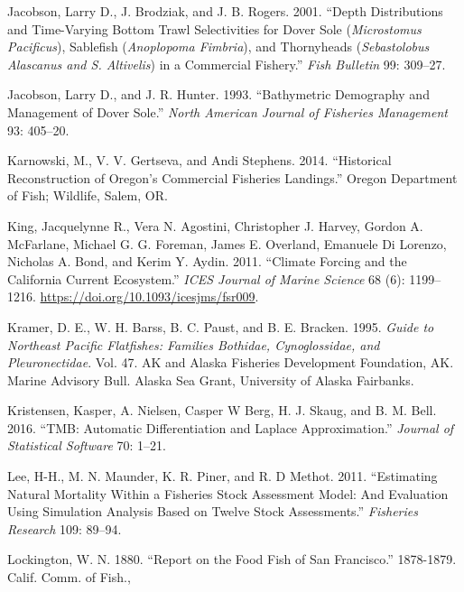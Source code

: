\documentclass[11pt,
  english,
  a4paper,
]{article}
\begin{document}
\begin{cslreferences}
\leavevmode\hypertarget{ref-jacobson_depth_2001}{}%
Jacobson, Larry D., J. Brodziak, and J. B. Rogers. 2001. ``Depth Distributions and Time-Varying Bottom Trawl Selectivities for Dover Sole (\emph{Microstomus Pacificus}), Sablefish (\emph{Anoplopoma Fimbria}), and Thornyheads (\emph{Sebastolobus Alascanus and S. Altivelis}) in a Commercial Fishery.'' \emph{Fish Bulletin} 99: 309--27.

\leavevmode\hypertarget{ref-jacobson_bathymetric_1993}{}%
Jacobson, Larry D., and J. R. Hunter. 1993. ``Bathymetric Demography and Management of Dover Sole.'' \emph{North American Journal of Fisheries Management} 93: 405--20.

\leavevmode\hypertarget{ref-karnowski_historical_2014}{}%
Karnowski, M., V. V. Gertseva, and Andi Stephens. 2014. ``Historical Reconstruction of Oregon's Commercial Fisheries Landings.'' Oregon Department of Fish; Wildlife, Salem, OR.

\leavevmode\hypertarget{ref-king_climate_2011}{}%
King, Jacquelynne R., Vera N. Agostini, Christopher J. Harvey, Gordon A. McFarlane, Michael G. G. Foreman, James E. Overland, Emanuele Di Lorenzo, Nicholas A. Bond, and Kerim Y. Aydin. 2011. ``Climate Forcing and the California Current Ecosystem.'' \emph{ICES Journal of Marine Science} 68 (6): 1199--1216. \url{https://doi.org/10.1093/icesjms/fsr009}.

\leavevmode\hypertarget{ref-kramer_guide_1995}{}%
Kramer, D. E., W. H. Barss, B. C. Paust, and B. E. Bracken. 1995. \emph{Guide to Northeast Pacific Flatfishes: Families Bothidae, Cynoglossidae, and Pleuronectidae}. Vol. 47. AK and Alaska Fisheries Development Foundation, AK. Marine Advisory Bull. Alaska Sea Grant, University of Alaska Fairbanks.

\leavevmode\hypertarget{ref-kristensen_tmb:_2016}{}%
Kristensen, Kasper, A. Nielsen, Casper W Berg, H. J. Skaug, and B. M. Bell. 2016. ``TMB: Automatic Differentiation and Laplace Approximation.'' \emph{Journal of Statistical Software} 70: 1--21.

\leavevmode\hypertarget{ref-Lee_est_m_2011}{}%
Lee, H-H., M. N. Maunder, K. R. Piner, and R. D Methot. 2011. ``Estimating Natural Mortality Within a Fisheries Stock Assessment Model: And Evaluation Using Simulation Analysis Based on Twelve Stock Assessments.'' \emph{Fisheries Research} 109: 89--94.

\leavevmode\hypertarget{ref-lockington_report_1880}{}%
Lockington, W. N. 1880. ``Report on the Food Fish of San Francisco.'' 1878-1879. Calif. Comm. of Fish.,


\end{cslreferences}
\end{document}
